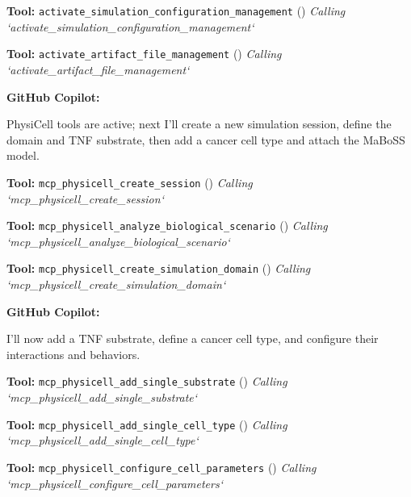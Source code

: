 \documentclass[11pt,a4paper]{article}
\begin{document}
\begin{toolokbox}
\textbf{Tool:} \texttt{activate\_simulation\_configuration\_management} (\checkmark)
\textit{Calling `activate\_simulation\_configuration\_management`}
\end{toolokbox}
\begin{toolokbox}
\textbf{Tool:} \texttt{activate\_artifact\_file\_management} (\checkmark)
\textit{Calling `activate\_artifact\_file\_management`}
\end{toolokbox}
\begin{copilotbox}
\textbf{GitHub Copilot:}

PhysiCell tools are active; next I’ll create a new simulation session, define the domain and TNF substrate, then add a cancer cell type and attach the MaBoSS model.

\end{copilotbox}
\begin{toolokbox}
\textbf{Tool:} \texttt{mcp\_physicell\_create\_session} (\checkmark)
\textit{Calling `mcp\_physicell\_create\_session`}
\end{toolokbox}
\begin{toolokbox}
\textbf{Tool:} \texttt{mcp\_physicell\_analyze\_biological\_scenario} (\checkmark)
\textit{Calling `mcp\_physicell\_analyze\_biological\_scenario`}
\end{toolokbox}
\begin{toolokbox}
\textbf{Tool:} \texttt{mcp\_physicell\_create\_simulation\_domain} (\checkmark)
\textit{Calling `mcp\_physicell\_create\_simulation\_domain`}
\end{toolokbox}
\begin{copilotbox}
\textbf{GitHub Copilot:}

I'll now add a TNF substrate, define a cancer cell type, and configure their interactions and behaviors.

\end{copilotbox}
\begin{toolokbox}
\textbf{Tool:} \texttt{mcp\_physicell\_add\_single\_substrate} (\checkmark)
\textit{Calling `mcp\_physicell\_add\_single\_substrate`}
\end{toolokbox}
\begin{toolokbox}
\textbf{Tool:} \texttt{mcp\_physicell\_add\_single\_cell\_type} (\checkmark)
\textit{Calling `mcp\_physicell\_add\_single\_cell\_type`}
\end{toolokbox}
\begin{toolokbox}
\textbf{Tool:} \texttt{mcp\_physicell\_configure\_cell\_parameters} (\checkmark)
\textit{Calling `mcp\_physicell\_configure\_cell\_parameters`}
\end{toolokbox}
\end{document}
